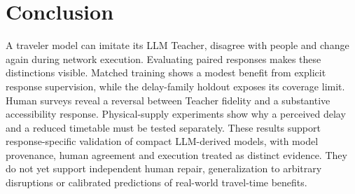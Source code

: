 \section{Conclusion}
\label{sec:conclusion}
A traveler model can imitate its LLM Teacher, disagree with people and change again during network execution. Evaluating paired responses makes these distinctions visible. Matched training shows a modest benefit from explicit response supervision, while the delay-family holdout exposes its coverage limit. Human surveys reveal a reversal between Teacher fidelity and a substantive accessibility response. Physical-supply experiments show why a perceived delay and a reduced timetable must be tested separately. These results support response-specific validation of compact LLM-derived models, with model provenance, human agreement and execution treated as distinct evidence. They do not yet support independent human repair, generalization to arbitrary disruptions or calibrated predictions of real-world travel-time benefits.
